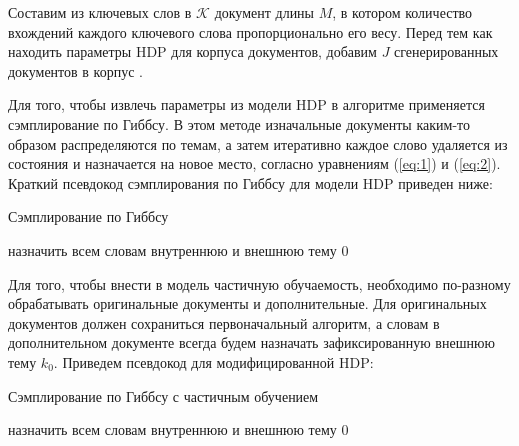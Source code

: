\documentclass[12pt, a4paper]{article}
\begin{document}
	Составим из ключевых слов в $\mathcal{K}$ документ длины $M$, в котором количество вхождений каждого ключевого слова пропорционально его весу. Перед тем как находить параметры HDP для корпуса документов, добавим $J$ сгенерированных документов в корпус \cite{ss-learning}. 
	
  Для того, чтобы извлечь параметры из модели HDP в алгоритме применяется сэмплирование по Гиббсу. В этом методе изначальные документы каким-то образом распределяются по темам, а затем итеративно каждое слово удаляется из состояния и назначается на новое место, согласно уравнениям (\ref{eq:1}) и (\ref{eq:2}). Краткий псевдокод сэмплирования по Гиббсу для модели HDP приведен ниже:
  
  \begin{algorithm}[H]
  	\caption{Сэмплирование по Гиббсу}
  	назначить всем словам внутреннюю и внешнюю тему $0$\;
  \end{algorithm}
  
  Для того, чтобы внести в модель частичную обучаемость, необходимо по-разному обрабатывать оригинальные документы и дополнительные. Для оригинальных документов должен сохраниться первоначальный алгоритм, а словам в дополнительном документе всегда будем назначать зафиксированную внешнюю тему $k_0$. Приведем псевдокод для модифицированной HDP:
  
  \begin{algorithm}[H]
  	\caption{Сэмплирование по Гиббсу с частичным обучением}
  	назначить всем словам внутреннюю и внешнюю тему $0$\;
  \end{algorithm}
  
\end{document}
